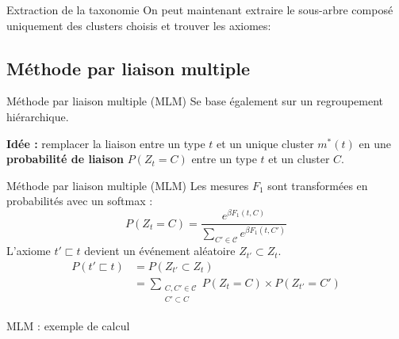 \documentclass{beamer}
\begin{document}
\begin{frame}{Extraction de la taxonomie}
    On peut maintenant extraire le sous-arbre composé uniquement des clusters choisis et trouver les axiomes:
    \begin{figure}
        
    \end{figure}
\end{frame}

\subsection{Méthode par liaison multiple}

\begin{frame}{Méthode par liaison multiple (MLM)}
    Se base également sur un regroupement hiérarchique.
    
    \textbf{Idée :} remplacer la liaison entre un type $t$ et un unique cluster $m^*(t)$ en une \textbf{probabilité de liaison} $P(Z_t = C)$ entre un type $t$ et un cluster $C$.
    \begin{figure}
        
    \end{figure}
\end{frame}

\begin{frame}{Méthode par liaison multiple (MLM)}
    Les mesures $F_1$ sont transformées en probabilités avec un softmax :
    \begin{equation}
        P(Z_t = C) = \frac{\displaystyle e^{ \beta F_1(t, C)}}{\displaystyle \sum_{C' \in \mathcal{C}} e^{\beta F_1(t, C')}}
    \end{equation}
    L'axiome $t' \sqsubset t$ devient un événement aléatoire $Z_{t'} \subset Z_{t}$.
    \begin{align}
        P(t' \sqsubset t) &= P(Z_{t'} \subset Z_{t}) \\
        &= \sum_{\substack{C, C' \in \mathcal{C} \\ C' \subset C}} P(Z_{t }= C) \times P(Z_{t'} = C')
    \end{align}
\end{frame}

\begin{frame}{MLM : exemple de calcul}
    \begin{figure}
        
    \end{figure}
\end{frame}
\end{document}
